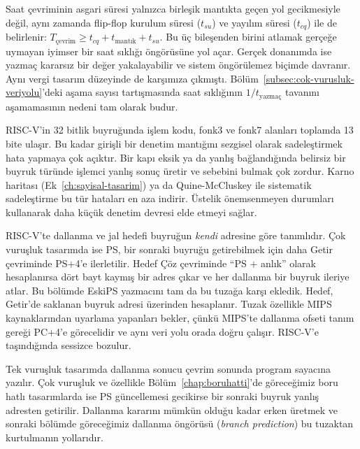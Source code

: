 Saat çevriminin asgari süresi yalnızca birleşik mantıkta geçen yol gecikmesiyle değil, aynı zamanda flip-flop kurulum süresi ($t_{su}$) ve yayılım süresi ($t_{cq}$) ile de belirlenir: $T_{\text{çevrim}} \geq t_{cq} + t_{\text{mantık}} + t_{su}$. Bu üç bileşenden birini atlamak gerçeğe uymayan iyimser bir saat sıklığı öngörüsüne yol açar. Gerçek donanımda ise yazmaç kararsız bir değer yakalayabilir ve sistem öngörülemez biçimde davranır. Aynı vergi tasarım düzeyinde de karşımıza çıkmıştı. Bölüm~\ref{subsec:cok-vurusluk-veriyolu}'deki aşama sayısı tartışmasında saat sıklığının $1/t_{\text{yazmaç}}$ tavanını aşamamasının nedeni tam olarak budur.

RISC-V'in 32 bitlik buyruğunda işlem kodu, fonk3 ve fonk7 alanları toplamda 13 bite ulaşır. Bu kadar girişli bir denetim mantığını sezgisel olarak sadeleştirmek hata yapmaya çok açıktır. Bir kapı eksik ya da yanlış bağlandığında belirsiz bir buyruk türünde işlemci yanlış sonuç üretir ve sebebini bulmak çok zordur. Karno haritası (Ek~\ref{ch:sayisal-tasarim}) ya da Quine-McCluskey ile sistematik sadeleştirme bu tür hataları en aza indirir. Üstelik önemsenmeyen durumları kullanarak daha küçük denetim devresi elde etmeyi sağlar.

RISC-V'te dallanma ve jal hedefi buyruğun \emph{kendi} adresine göre tanımlıdır. Çok vuruşluk tasarımda ise PS, bir sonraki buyruğu getirebilmek için daha Getir çevriminde PS$+$4'e ilerletilir. Hedef Çöz çevriminde ``PS $+$ anlık'' olarak hesaplanırsa dört bayt kaymış bir adres çıkar ve her dallanma bir buyruk ileriye atlar. Bu bölümde EskiPS yazmacını tam da bu tuzağa karşı ekledik. Hedef, Getir'de saklanan buyruk adresi üzerinden hesaplanır. Tuzak özellikle MIPS kaynaklarından uyarlama yapanları bekler, çünkü MIPS'te dallanma ofseti tanım gereği PC$+$4'e görecelidir ve aynı veri yolu orada doğru çalışır. RISC-V'e taşındığında sessizce bozulur.

Tek vuruşluk tasarımda dallanma sonucu çevrim sonunda program sayacına yazılır. Çok vuruşluk ve özellikle Bölüm~\ref{chap:boruhatti}'de göreceğimiz boru hatlı tasarımlarda ise PS güncellemesi gecikirse bir sonraki buyruk yanlış adresten getirilir. Dallanma kararını mümkün olduğu kadar erken üretmek ve sonraki bölümde göreceğimiz dallanma öngörüsü (\emph{branch prediction}) bu tuzaktan kurtulmanın yollarıdır.


